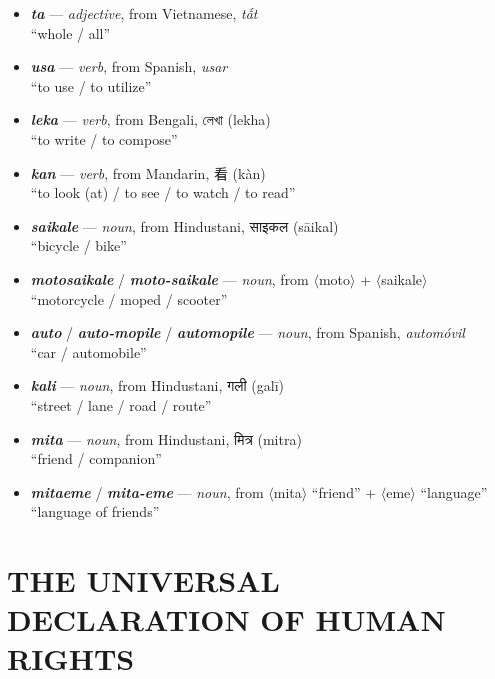 \documentclass[a4paper, titlepage]{article}
\begin{document}
\begin{itemize}
	\item \textbf{\textit{ta}} — \textit{adjective}, from Vietnamese, \textit{tất} \\``whole / all''
	\item \textbf{\textit{usa}} — \textit{verb}, from Spanish, \textit{usar} \\``to use /  to utilize''
	\item \textbf{\textit{leka}} — \textit{verb}, from Bengali, {\benfont লেখা} (lekha) \\``to write /  to compose''
	\item \textbf{\textit{kan}} — \textit{verb}, from Mandarin, 看 (kàn) \\``to look (at) / to see / to watch / to read''
	\item \textbf{\textit{saikale}}  — \textit{noun}, from Hindustani, {\hmfont साइकल} (sāikal) \\``bicycle / bike''
	\item \textbf{\textit{motosaikale}} / \textbf{\textit{moto-saikale}}  — \textit{noun}, from $\langle$moto$\rangle$ + $\langle$saikale$\rangle$ \\``motorcycle / moped / scooter''
	\item \textbf{\textit{auto}} / \textbf{\textit{auto-mopile}} / \textbf{\textit{automopile}}  — \textit{noun}, from Spanish, \textit{automóvil} \\``car / automobile''
	\item \textbf{\textit{kali}}  — \textit{noun}, from Hindustani, {\hmfont गली} (galī) \\ ``street / lane / road / route''
	\item \textbf{\textit{mita}}  — \textit{noun}, from Hindustani, {\hmfont मित्र} (mitra) \\ ``friend / companion''
	\item \textbf{\textit{mitaeme}} / \textbf{\textit{mita-eme}}  — \textit{noun}, from $\langle$mita$\rangle$ ``friend'' + $\langle$eme$\rangle$ ``language'' \\ ``language of friends''
	
\end{itemize}

\section{THE UNIVERSAL DECLARATION OF HUMAN RIGHTS}
\end{document}
